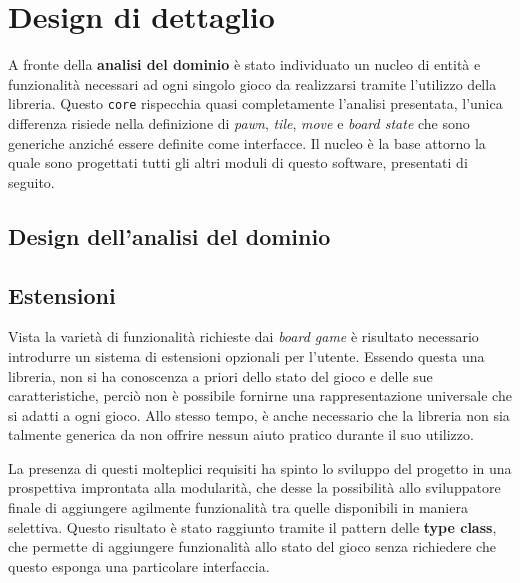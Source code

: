 \section{Design di dettaglio}



A fronte della \textbf{analisi del dominio} è stato individuato un nucleo di entità e funzionalità necessari ad ogni singolo gioco da realizzarsi tramite l'utilizzo della libreria.
%
Questo \texttt{core} rispecchia quasi completamente l'analisi presentata, l'unica differenza risiede nella definizione di \textit{pawn}, \textit{tile}, \textit{move} e \textit{board state} che sono generiche anziché essere definite come interfacce.
%
Il nucleo è la base attorno la quale sono progettati tutti gli altri moduli di questo software, presentati di seguito.

\subsection{Design dell'analisi del dominio}

\subsection{Estensioni}
Vista la varietà di funzionalità richieste dai \textit{board game} è risultato necessario introdurre un sistema di estensioni opzionali per l'utente.
%
Essendo questa una libreria, non si ha conoscenza a priori dello stato del gioco e delle sue caratteristiche, perciò non è possibile fornirne una rappresentazione universale che si adatti a ogni gioco.
%
Allo stesso tempo, è anche necessario che la libreria non sia talmente generica da non offrire nessun aiuto pratico durante il suo utilizzo.

La presenza di questi molteplici requisiti ha spinto lo sviluppo del progetto in una prospettiva improntata alla modularità, che desse la possibilità allo sviluppatore finale di aggiungere agilmente funzionalità tra quelle disponibili in maniera selettiva.
%
Questo risultato è stato raggiunto tramite il pattern delle \textbf{type class}, che permette di aggiungere funzionalità allo stato del gioco senza richiedere che questo esponga una particolare interfaccia.

